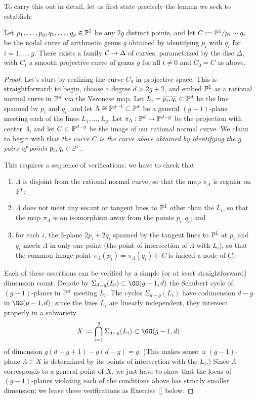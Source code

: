 To carry this out in detail, let us first state precisely the lemma we seek to establish:

\begin{lemma}
Let $p_1, \dots, p_g, q_1, \dots, q_g \in \PP^1$ be any $2g$ distinct points, and let $C := \PP^1/p_i \sim q_i$ be the nodal curve of arithmetic genus $g$ obtained by identifying $p_i$ with $q_i$ for $i = 1,\dots,g$. There exists a family $\cC \to  \Delta $ of curves, parametrized by the disc $\Delta$, with $C_t$ a smooth projective curve of genus $g$ for all $t \neq 0$ and $C_0 = C$ as above.
\end{lemma}

\begin{proof}
Let's start by realizing the curve $C_0$ in projective space. This is straightforward: to begin, choose a degree $d > 2g+2$, and embed $\PP^1$ as a rational normal curve in $\PP^d$ via the Veronese map. Let $L_i = \overline{p_i,q_i} \subset \PP^d$ be the line spanned by $p_i$ and $q_i$, and let $\Lambda \cong \PP^{g-1} \subset \PP^d$ be a general $(g-1)$-plane meeting each of the lines $L_1,\dots,L_g$. Let $\pi_\Lambda : \PP^d \to \PP^{d-g}$ be the projection with center $\Lambda$, and let $C \subset \PP^{d-g}$ be the image of our rational normal curve. We claim to begin with that \emph{the curve $C$ is the curve above obtained by identifying the $g$ pairs of points $p_i, q_i \in \PP^1$}. 

This requires a sequence of verifications: we have to check that
\begin{enumerate}
\item $\Lambda$ is disjoint from the rational normal curve, so that the map $\pi_\Lambda$ is regular on $\PP^1$;
\item $\Lambda$ does not meet any secant or tangent lines to $\PP^1$ other than the $L_i$, so that the map $\pi_\Lambda$ is an isomorphism away from the points $p_i, q_i$; and
\item for each $i$, the 3-plane $\overline{2p_i + 2q_i}$ spanned by the tangent lines to $\PP^1$ at $p_i$ and $q_i$ meets $\Lambda$ in only one point (the point of intersection of $\Lambda$ with $L_i$), so that the common image point $\pi_\Lambda(p_i) = \pi_\Lambda(q_i) \in C$ is indeed a node of $C$.
\end{enumerate}

Each of these assertions can be verified by a simple (or at least straightforward) dimension count. Denote by $\Sigma_{d-g}(L_i) \subset \GG(g-1, d)$ the Schubert cycle of $(g-1)$-planes in $\PP^d$ meeting $L_i$. The cycles $\Sigma_{d-g}(L_i)$ have codimension $d-g$ in $\GG(g-1,d)$; since the lines $L_i$ are linearly independent, they intersect properly in a subvariety
$$
X := \bigcap_{i=1}^g \Sigma_{d-g}(L_i) \subset \GG(g-1,d)
$$
of dimension $g(d-g+1) - g(d-g) = g$. (This makes sense: a $(g-1)$-plane $\Lambda \in X$ is determined by its points of intersection with the $L_i$.) Since $\Lambda$ corresponds to a general point of $X$, we just have to show that the locus of $(g-1)$-planes violating each of the conditions above has strictly smaller dimension; we leave these verifications as Exercise~\ref{} below.


\end{proof}
